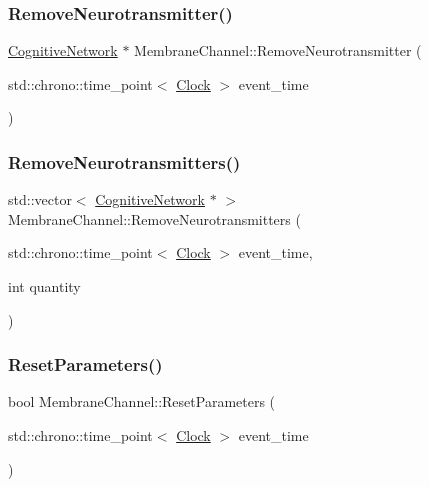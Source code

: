 \mbox{\label{classMembraneChannel_a2252f222f4a41bf1975dc856569e0a22}} 
\subsubsection{\texorpdfstring{Remove\+Neurotransmitter()}{RemoveNeurotransmitter()}}
{\footnotesize\ttfamily \mbox{\hyperlink{classCognitiveNetwork}{Cognitive\+Network}} $\ast$ Membrane\+Channel\+::\+Remove\+Neurotransmitter (\begin{DoxyParamCaption}\item[{std\+::chrono\+::time\+\_\+point$<$ \mbox{\hyperlink{universe_8h_a0ef8d951d1ca5ab3cfaf7ab4c7a6fd80}{Clock}} $>$}]{event\+\_\+time }\end{DoxyParamCaption})}

\mbox{\label{classMembraneChannel_a37f22ddd877e3be7b353048149a7bbcd}} 
\subsubsection{\texorpdfstring{Remove\+Neurotransmitters()}{RemoveNeurotransmitters()}}
{\footnotesize\ttfamily std\+::vector$<$ \mbox{\hyperlink{classCognitiveNetwork}{Cognitive\+Network}} $\ast$ $>$ Membrane\+Channel\+::\+Remove\+Neurotransmitters (\begin{DoxyParamCaption}\item[{std\+::chrono\+::time\+\_\+point$<$ \mbox{\hyperlink{universe_8h_a0ef8d951d1ca5ab3cfaf7ab4c7a6fd80}{Clock}} $>$}]{event\+\_\+time,  }\item[{int}]{quantity }\end{DoxyParamCaption})}

\mbox{\label{classMembraneChannel_a5982040b46efe5e2b824d1cf4dead25e}} 
\subsubsection{\texorpdfstring{Reset\+Parameters()}{ResetParameters()}}
{\footnotesize\ttfamily bool Membrane\+Channel\+::\+Reset\+Parameters (\begin{DoxyParamCaption}\item[{std\+::chrono\+::time\+\_\+point$<$ \mbox{\hyperlink{universe_8h_a0ef8d951d1ca5ab3cfaf7ab4c7a6fd80}{Clock}} $>$}]{event\+\_\+time }\end{DoxyParamCaption})}


